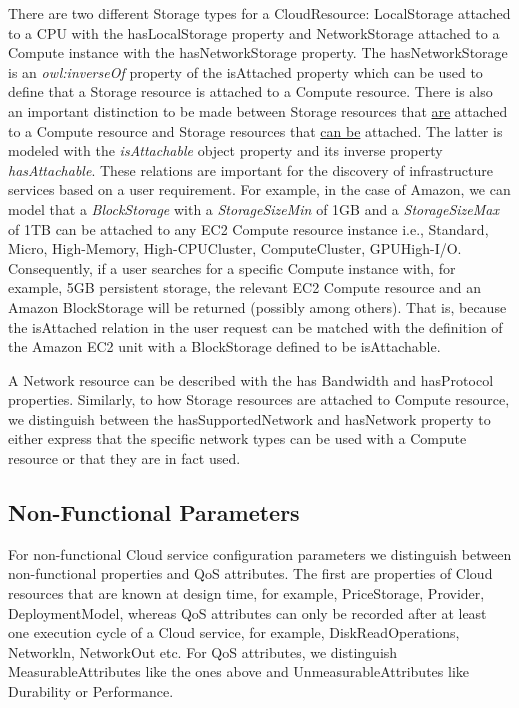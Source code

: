 There are two different Storage types for a CloudResource: LocalStorage attached to a CPU with the hasLocalStorage property and NetworkStorage attached to a Compute instance with the hasNetworkStorage property. The hasNetworkStorage is an \textit{owl:inverseOf} property of the isAttached property which can be used to define that a Storage resource is attached to a Compute resource. There is also an important distinction to be made between Storage resources that \underline{are} attached to a Compute resource and Storage resources that \underline{can be} attached. The latter is modeled with the \textit{isAttachable} object property and its inverse property \textit{hasAttachable}. These relations are important for the discovery of infrastructure services based on a user requirement.
For example, in the case of Amazon, we can model that a \textit{BlockStorage} with a \textit{StorageSizeMin} of 1GB and a \textit{StorageSizeMax} of 1TB can be attached to any EC2 Compute resource instance i.e., Standard, Micro, High-Memory, High-CPUCluster, ComputeCluster, GPUHigh-I/O.
Consequently, if a user searches for a specific Compute instance with, for example, 5GB persistent storage, the relevant EC2 Compute resource and an Amazon BlockStorage will be returned (possibly among others). That is, because the isAttached relation in the user request can be matched with the definition of the Amazon EC2 unit with a BlockStorage defined to be isAttachable.

A Network resource can be described with the
has Bandwidth and hasProtocol properties. Similarly, to how
Storage resources are attached to Compute resource, we
distinguish between the hasSupportedNetwork and
hasNetwork property to either express that the specific
network types can be used with a Compute resource or that
they are in fact used.

\subsection{Non-Functional Parameters}
For non-functional Cloud service configuration parameters we distinguish between non-functional properties and QoS attributes. The first are properties of Cloud resources that are known at design time, for example,
PriceStorage, Provider, DeploymentModel,
whereas QoS attributes can only be recorded after at least one execution cycle of a Cloud service, for example, DiskReadOperations, Networkln, NetworkOut etc.
For QoS attributes, we distinguish MeasurableAttributes like the ones above and
UnmeasurableAttributes like Durability or Performance.

